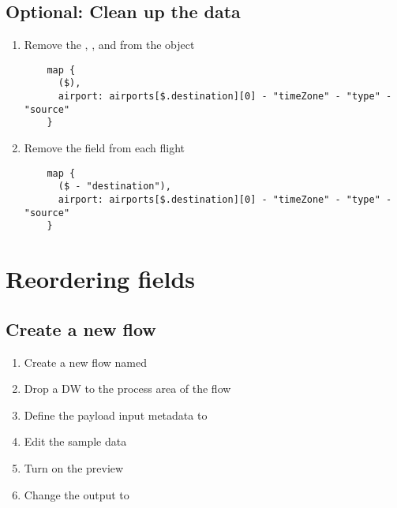 \subsection{Optional: Clean up the data}
\begin{enumerate}[resume*]
\item Remove the , , and  from the  object
  \begin{verbatim}
    map {
      ($),
      airport: airports[$.destination][0] - "timeZone" - "type" - "source"
    }
  \end{verbatim}
\item Remove the  field from each flight
  \begin{verbatim}
    map {
      ($ - "destination"),
      airport: airports[$.destination][0] - "timeZone" - "type" - "source"
    }
  \end{verbatim}
\end{enumerate}

\section{Reordering fields}

\subsection{Create a new flow}
\begin{enumerate}
\item Create a new flow named 
\item Drop a DW to the process area of the flow
\item Define the payload input metadata to 
\item Edit the sample data
\item Turn on the preview
\item Change the output to 
\end{enumerate}


